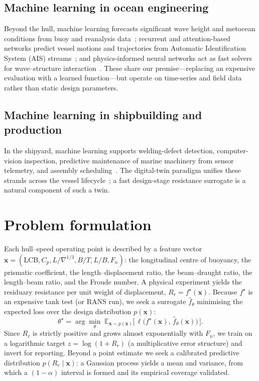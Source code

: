 \documentclass[pdflatex,sn-mathphys-num]{sn-jnl}%
\theoremstyle{thmstyleone}%
\theoremstyle{thmstyletwo}%
\theoremstyle{thmstylethree}%
\begin{document}
\subsection{Machine learning in ocean engineering}\label{subsec:oe}
Beyond the hull, machine learning forecasts significant wave height and metocean
conditions from buoy and reanalysis data~\cite{james2018}; recurrent and
attention-based networks predict vessel motions and trajectories from Automatic
Identification System (AIS) streams~\cite{murray2021}; and physics-informed
neural networks act as fast solvers for wave--structure
interaction~\cite{raissi2019}. These share our premise---replacing an expensive
evaluation with a learned function---but operate on time-series and field data
rather than static design parameters.

\subsection{Machine learning in shipbuilding and production}\label{subsec:sb}
In the shipyard, machine learning supports welding-defect detection,
computer-vision inspection, predictive maintenance of marine machinery from
sensor telemetry, and assembly scheduling~\cite{lee2021,kong2022}. The
digital-twin paradigm unifies these strands across the vessel
lifecycle~\cite{major2021}; a fast design-stage resistance surrogate is a natural
component of such a twin.

\section{Problem formulation}\label{sec:problem}

Each hull--speed operating point is described by a feature vector
$\mathbf{x}=(\mathrm{LCB},C_p,L/\nabla^{1/3},B/T,L/B,F_n)$: the longitudinal
centre of buoyancy, the prismatic coefficient, the length--displacement ratio,
the beam--draught ratio, the length--beam ratio, and the Froude number. A
physical experiment yields the residuary resistance per unit weight of
displacement, $R_r=f^{\star}(\mathbf{x})$. Because $f^{\star}$ is an expensive
tank test (or RANS run), we seek a surrogate $\hat{f}_{\theta}$ minimising the
expected loss over the design distribution $p(\mathbf{x})$:
\begin{equation}
\theta^{\star}=\arg\min_{\theta}\;
\mathbb{E}_{\mathbf{x}\sim p(\mathbf{x})}
\big[\,\ell\big(f^{\star}(\mathbf{x}),\,\hat{f}_{\theta}(\mathbf{x})\big)\,\big].
\label{eq:erm}
\end{equation}
Since $R_r$ is strictly positive and grows almost exponentially with $F_n$, we
train on a logarithmic target $z=\log(1+R_r)$ (a multiplicative error structure)
and invert for reporting. Beyond a point estimate we seek a calibrated predictive
distribution $p(R_r\mid\mathbf{x})$: a Gaussian process yields a mean and
variance, from which a $(1-\alpha)$ interval is formed and its empirical coverage
validated.
\end{document}

